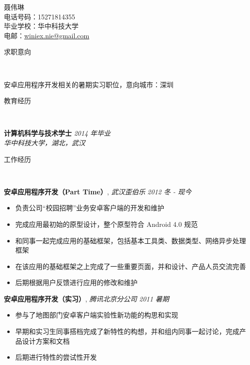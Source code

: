 \documentclass[9pt]{ctexart}
\newenvironment{changemargin}[2]{%
  \begin{list}{}{%
    \setlength{\topsep}{0pt}%
    \setlength{\leftmargin}{#1}%
    \setlength{\rightmargin}{#2}%
    \setlength{\listparindent}{\parindent}%
    \setlength{\itemindent}{\parindent}%
    \setlength{\parsep}{\parskip}%
  }%
  \item[]}{\end{list}
}
\newcommand{\lineover}{
	\begin{changemargin}{-0.05in}{-0.05in}
		\vspace*{-8pt}
		\hrulefill \\
		\vspace*{-2pt}
	\end{changemargin}
}
\newcommand{\header}[1]{
	\begin{changemargin}{-0.5in}{-0.5in}
		\scshape{#1}\\
  	\lineover
	\end{changemargin}
}
\newcommand{\contact}[4]{
	\begin{changemargin}{-0.5in}{-0.5in}
		\begin{center}
			{\Large \scshape {#1}}\\ \smallskip
			{#2}\\ \smallskip 
			{#3}\\ \smallskip
			{#4}\smallskip
		\end{center}
	\end{changemargin}
}
\newenvironment{body} {
	\vspace*{-16pt}
	\begin{changemargin}{-0.25in}{-0.5in}
  }	
	{\end{changemargin}
}
\begin{document}
\contact{聂伟琳}{电话号码：15271814355}{毕业学校：华中科技大学}{电邮：\href{mailto:winiex.nie@gmail.com}{winiex.nie@gmail.com}}


\header{求职意向}

\begin{body}
	\vspace{14pt}
	安卓应用程序开发相关的暑期实习职位，意向城市：深圳
\end{body}

\smallskip


\header{教育经历}

\begin{body}
	\vspace{14pt}
	\textbf{计算机科学与技术学士}{} \hfill \emph{2014 年毕业}{} \\
	\emph{华中科技大学，湖北，武汉}{} \\
  \medskip
\end{body}

\smallskip


\header{工作经历}

\begin{body}
	\vspace{14pt}
	\textbf{安卓应用程序开发（Part Time）}, \emph{武汉歪伯乐} \hfill \emph{2012 冬 - 现今}\\
	\vspace*{-4pt}
	\begin{itemize} \itemsep -0pt  %
		\item 负责公司“校园招聘”业务安卓客户端的开发和维护
		\item 完成应用最初始的原型设计，整个原型符合 Android 4.0 规范
		\item 和同事一起完成应用的基础框架，包括基本工具类、数据类型、网络异步处理框架
		\item 在该应用的基础框架之上完成了一些重要页面，并和设计、产品人员交流完善
		\item 后期根据用户反馈进行应用的修改和维护
	\end{itemize}

	\textbf {安卓应用程序开发（实习）}, \emph{腾讯北京分公司} \hfill \emph{2011 暑期}\\
	\vspace*{-4pt}
	\begin{itemize} \itemsep -0pt
		\item 参与了地图部门安卓客户端实验性新功能的构思和实现
		\item 早期和实习生同事搭档完成了新特性的构想，并和组内同事一起讨论，完成产品设计方案和文档
		\item 后期进行特性的尝试性开发
	\end{itemize}
\end{body}
\end{document}
